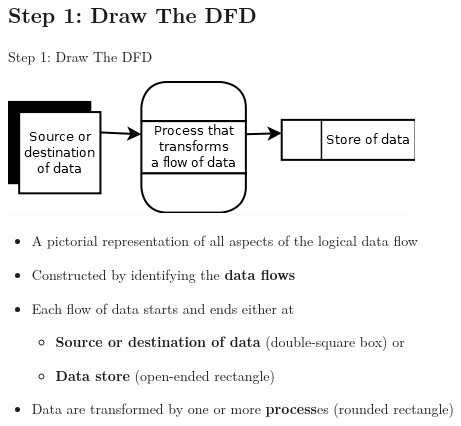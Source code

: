 \documentclass{beamer}
\begin{document}
	\subsection{Step 1: Draw The DFD}
	\begin{frame}{Step 1: Draw The DFD}
		\begin{center}
			\includegraphics[scale=0.5]{img/01_dfd_symbols}
		\end{center}	
		\begin{itemize}
			\item A pictorial representation of all aspects of the logical data flow
			\item Constructed by identifying the \textbf{data flows}
			\item Each flow of data starts and ends either at
			\begin{itemize}
				\item \textbf{Source or destination of data} (double-square box) or
				\item \textbf{Data store} (open-ended rectangle)
			\end{itemize}
			\item Data are transformed by one or more \textbf{process}es (rounded rectangle)
		\end{itemize}
	\end{frame}
\end{document}
